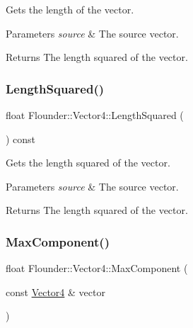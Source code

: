 Gets the length of the vector. 


\begin{DoxyParams}{Parameters}
{\em source} & The source vector. \\
\hline
\end{DoxyParams}
\begin{DoxyReturn}{Returns}
The length squared of the vector. 
\end{DoxyReturn}
\mbox{\label{class_flounder_1_1_vector4_a2bf6a8432449892c513ecedec89ce573}} 
\subsubsection{\texorpdfstring{Length\+Squared()}{LengthSquared()}\hspace{0.1cm}{\footnotesize\ttfamily [2/2]}}
{\footnotesize\ttfamily float Flounder\+::\+Vector4\+::\+Length\+Squared (\begin{DoxyParamCaption}{ }\end{DoxyParamCaption}) const}



Gets the length squared of the vector. 


\begin{DoxyParams}{Parameters}
{\em source} & The source vector. \\
\hline
\end{DoxyParams}
\begin{DoxyReturn}{Returns}
The length squared of the vector. 
\end{DoxyReturn}
\mbox{\label{class_flounder_1_1_vector4_ab19aaf6f1418fc42c4855d4843fe018c}} 
\subsubsection{\texorpdfstring{Max\+Component()}{MaxComponent()}}
{\footnotesize\ttfamily float Flounder\+::\+Vector4\+::\+Max\+Component (\begin{DoxyParamCaption}\item[{const \hyperlink{class_flounder_1_1_vector4}{Vector4} \&}]{vector }\end{DoxyParamCaption})\hspace{0.3cm}{\ttfamily [static]}}



